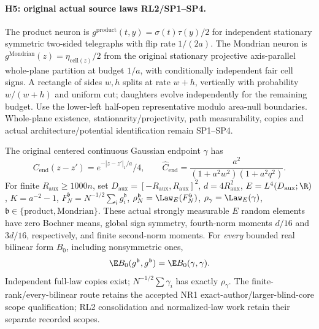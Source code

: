 \paragraph{H5: original actual source laws RL2/SP1--SP4.}
The product neuron is $g^{\mathrm{product}}(t,y)=\sigma(t)\tau(y)/2$ for
independent stationary symmetric two-sided telegraphs with flip rate $1/(2a)$.
The Mondrian neuron is $g^{\mathrm{Mondrian}}(z)=\eta_{\mathrm{cell}(z)}/2$
from the original stationary projective axis-parallel whole-plane partition
at budget $1/a$, with conditionally independent fair cell signs. A rectangle
of sides $w,h$ splits at rate $w+h$, vertically with probability $w/(w+h)$
and uniform cut; daughters evolve independently for the remaining budget.
Use the lower-left half-open representative modulo area-null boundaries.
Whole-plane existence, stationarity/projectivity, path measurability,
copies and actual architecture/potential identification remain SP1--SP4.

The original centered continuous Gaussian endpoint $\gamma$ has
\[
 C_{\mathrm{end}}(z-z')=e^{-|z-z'|_1/a}/4,\qquad
 \hat C_{\mathrm{end}}=\frac{a^2}{(1+a^2w^2)(1+a^2q^2)}.
\]
For finite $R_{\mathrm{aux}}\ge1000n$, set
$D_{\mathrm{aux}}=[-R_{\mathrm{aux}},R_{\mathrm{aux}}]^2$,
$d=4R_{\mathrm{aux}}^2$, $E=L^4(D_{\mathrm{aux}};\R)$, $K=a^{-2}-1$,
$F_N^{\mathfrak b}=N^{-1/2}\sum_i g_i^{\mathfrak b}$,
$\rho_N^{\mathfrak b}=\Law_E(F_N^{\mathfrak b})$,
$\rho_\gamma=\Law_E(\gamma)$, $\mathfrak b\in\{\mathrm{product},\mathrm{Mondrian}\}$.
These actual strongly measurable $E$ random elements have zero Bochner
means, global sign symmetry, fourth-norm moments $d/16$ and $3d/16$,
respectively, and finite second-norm moments. For \emph{every} bounded real
bilinear form $B_0$, including nonsymmetric ones,
\[
 \E B_0(g^{\mathfrak b},g^{\mathfrak b})=\E B_0(\gamma,\gamma).
\]
Independent full-law copies exist; $N^{-1/2}\sum\gamma_i$ has exactly
$\rho_\gamma$. The finite-rank/every-bilinear route retains the accepted NR1
exact-author/larger-blind-core scope qualification; RL2 consolidation and
normalized-law work retain their separate recorded scopes.

